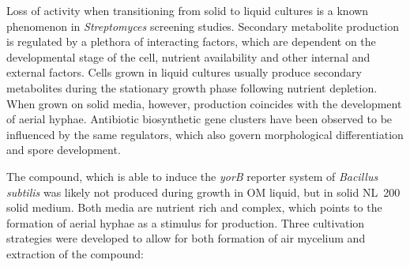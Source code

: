 Loss of activity when transitioning from solid to liquid cultures is a known phenomenon in \emph{Streptomyces} screening studies.\autocite{Pickup1993,SHOMURA1979}
Secondary metabolite production is regulated by a plethora of interacting factors, which are dependent on the developmental stage of the cell, nutrient availability and other internal and external factors.\autocite{Cihak2017,Jones2017,Gao2012,Bibb2005}
Cells grown in liquid cultures usually produce secondary metabolites during the stationary growth phase following nutrient depletion.\autocite{Bibb2005}
When grown on solid media, however, production coincides with the development of aerial hyphae.
Antibiotic biosynthetic gene clusters have been observed to be influenced by the same regulators, which also govern morphological differentiation and spore development.\autocite{Ostash2011,DenHengst2010}

The compound, which is able to induce the \emph{yorB} reporter system of \emph{Bacillus subtilis} was likely not produced during growth in OM liquid, but in solid NL~200 solid medium.
Both media are nutrient rich and complex, which points to the formation of aerial hyphae as a stimulus for production.
Three cultivation strategies were developed to allow for both formation of air mycelium and extraction of the compound:

